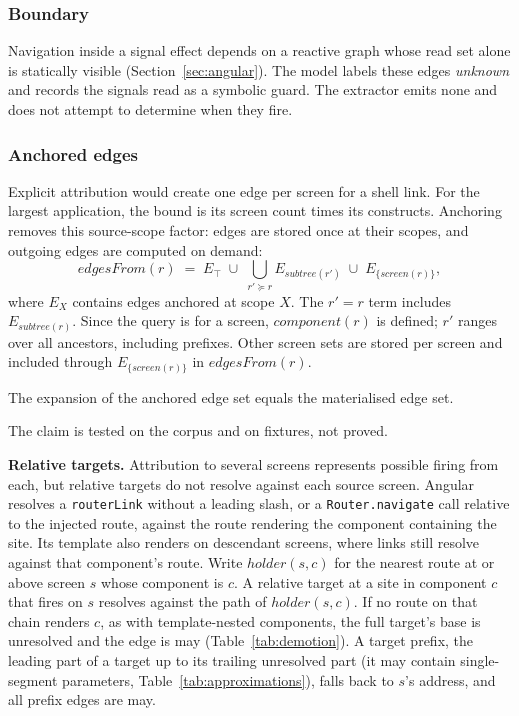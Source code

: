 \subsubsection{Boundary}
\label{sec:boundary}

Navigation inside a signal effect depends on a reactive graph whose read set alone is
statically visible (Section~\ref{sec:angular}). The model labels these edges \emph{unknown}
and records the signals read as a symbolic guard. The extractor emits none and does not
attempt to determine when they fire.

\subsubsection{Anchored edges}
\label{sec:anchored}

Explicit attribution would create one edge per screen for a shell link. For the largest
application, the bound is its screen count times its
\ConstructsMifos{} constructs. Anchoring removes this source-scope factor: edges are stored
once at their scopes, and outgoing edges are computed on demand:
\[
  \mathit{edgesFrom}(r) \;=\; E_\top \;\cup\; \bigcup_{r' \succeq r}
  E_{\mathit{subtree}(r')} \;\cup\; E_{\{\mathit{screen}(r)\}},
\]
where $E_X$ contains edges anchored at scope $X$. The $r' = r$ term includes
$E_{\mathit{subtree}(r)}$. Since the query is for a screen, $\mathit{component}(r)$ is defined;
$r'$ ranges over all ancestors, including prefixes. Other screen sets are stored per screen
and included through $E_{\{\mathit{screen}(r)\}}$ in $\mathit{edgesFrom}(r)$.

\begin{claim}[Expansion]
\label{claim:expansion}
The expansion of the anchored edge set equals the materialised edge set.
\end{claim}
\noindent The claim is tested on the corpus and on fixtures, not proved.

\textbf{Relative targets.} Attribution to several screens represents possible firing from each,
but relative targets do not resolve against each source screen. Angular resolves a
\texttt{routerLink} without a leading slash, or a \texttt{Router.navigate} call relative to
the injected route, against the route rendering the component containing the site. Its template
also renders on descendant screens, where links still resolve against that component's route.
Write $\mathit{holder}(s, c)$ for the nearest route at or above screen $s$ whose component is
$c$. A relative target at a site in component $c$ that fires on $s$ resolves against the path of $\mathit{holder}(s, c)$. If no route on that chain renders $c$, as with template-nested
components, the full target's base is unresolved and the edge is may
(Table~\ref{tab:demotion}). A target prefix, the leading part of a target up to its trailing unresolved part (it may contain single-segment parameters, Table~\ref{tab:approximations}), falls back to $s$'s address, and all prefix edges are may.

